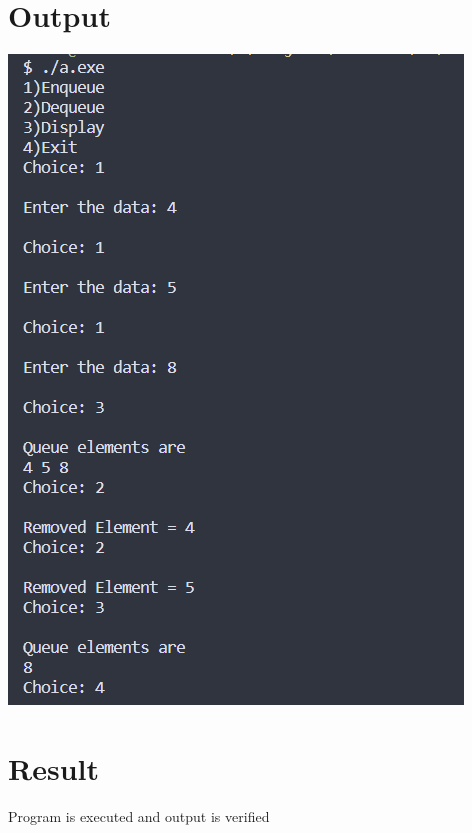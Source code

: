 \section{Output}
\includegraphics[]{Cycle_1/Outputs/Queue.png}

\section{Result}
Program is executed and output is verified